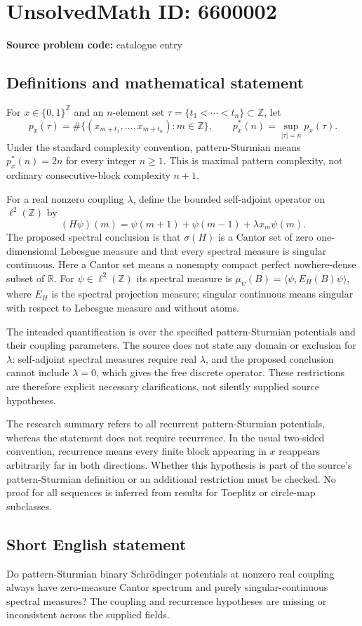 \documentclass[11pt]{article}
\newcommand{\Z}{\mathbb{Z}}
\newcommand{\R}{\mathbb{R}}
\begin{document}
\section*{UnsolvedMath ID: 6600002}
\textbf{Source problem code:} catalogue entry
\subsection{Definitions and mathematical statement}
For $x\in\{0,1\}^{\Z}$ and an $n$-element set $\tau=\{t_1<\cdots<t_n\}\subset\Z$, let
\[
p_x(\tau)=\#\{(x_{m+t_1},\ldots,x_{m+t_n}):m\in\Z\},\qquad
p_x^*(n)=\sup_{|\tau|=n}p_x(\tau).
\]
Under the standard complexity convention, pattern-Sturmian means $p_x^*(n)=2n$ for every integer $n\geq1$. This is maximal pattern complexity, not ordinary consecutive-block complexity $n+1$.

For a real nonzero coupling $\lambda$, define the bounded self-adjoint operator on $\ell^2(\Z)$ by
\[
(H\psi)(m)=\psi(m+1)+\psi(m-1)+\lambda x_m\psi(m).
\]
The proposed spectral conclusion is that $\sigma(H)$ is a Cantor set of zero one-dimensional Lebesgue measure and that every spectral measure is singular continuous. Here a Cantor set means a nonempty compact perfect nowhere-dense subset of $\R$. For $\psi\in\ell^2(\Z)$ its spectral measure is $\mu_\psi(B)=\langle\psi,E_H(B)\psi\rangle$, where $E_H$ is the spectral projection measure; singular continuous means singular with respect to Lebesgue measure and without atoms.

The intended quantification is over the specified pattern-Sturmian potentials and their coupling parameters. The source does not state any domain or exclusion for $\lambda$: self-adjoint spectral measures require real $\lambda$, and the proposed conclusion cannot include $\lambda=0$, which gives the free discrete operator. These restrictions are therefore explicit necessary clarifications, not silently supplied source hypotheses.

The research summary refers to all recurrent pattern-Sturmian potentials, whereas the statement does not require recurrence. In the usual two-sided convention, recurrence means every finite block appearing in $x$ reappears arbitrarily far in both directions. Whether this hypothesis is part of the source's pattern-Sturmian definition or an additional restriction must be checked. No proof for all sequences is inferred from results for Toeplitz or circle-map subclasses.
\subsection{Short English statement}
Do pattern-Sturmian binary Schr\"odinger potentials at nonzero real coupling always have zero-measure Cantor spectrum and purely singular-continuous spectral measures? The coupling and recurrence hypotheses are missing or inconsistent across the supplied fields.
\end{document}
